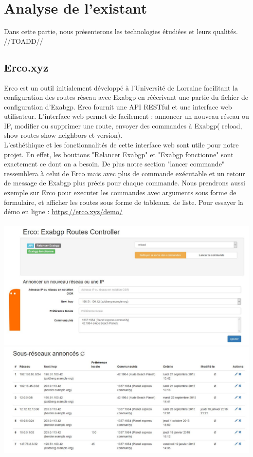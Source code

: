 \section{Analyse de l'existant}
Dans cette partie, nous présenterons les technologies étudiées et leurs qualités. //TOADD//

\subsection{Erco.xyz \cite{Erco}}

Erco est un outil initialement développé à l'Université de Lorraine facilitant la configuration  des routes réseau avec Exabgp en réécrivant une partie du fichier de configuration d'Exabgp. Erco fournit une API RESTful et une interface web utilisateur. L'interface web permet de facilement : annoncer un nouveau réseau ou IP, modifier ou supprimer une route, envoyer des commandes à Exabgp( reload, show routes show neighbors et version).\\
L'esthéthique et les fonctionnalités de cette interface web sont utile pour notre projet. En effet, les bouttons "Relancer Exabgp" et "Exabgp fonctionne" sont exactement ce dont on a besoin. De plus notre section "lancer commande" ressemblera à celui de Erco mais avec plus de commande exécutable et un retour de message de Exabgp plus précis pour chaque commande. Nous prendrons aussi exemple sur Erco pour executer les commandes avec arguments sous forme de formulaire, et afficher les routes sous forme de tableaux, de liste.
Pour essayer la démo en ligne : \url{https://erco.xyz/demo/}
\\
\\
\includegraphics[scale = 0.5]{img/erco1.JPG}
\includegraphics[scale = 0.5]{img/erco2.JPG}


